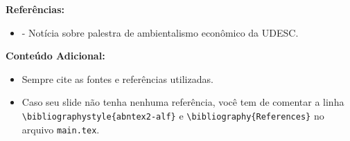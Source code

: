 
\begin{frame}
    \textbf{Referências:}
    \begin{itemize}
        \item \cite{udesc} - Notícia sobre palestra de ambientalismo econômico da UDESC.
    \end{itemize}
\end{frame}

\begin{frame}
    \textbf{Conteúdo Adicional:}
    \begin{itemize}
        \item Sempre cite as fontes e referências utilizadas.
        \item Caso seu slide não tenha nenhuma referência, você tem de comentar a linha \texttt{\texttt{\textbackslash bibliographystyle\{abntex2-alf\}}} e \texttt{\texttt{\textbackslash bibliography\{References\}}} no arquivo \texttt{main.tex}.
    \end{itemize}
\end{frame} %

